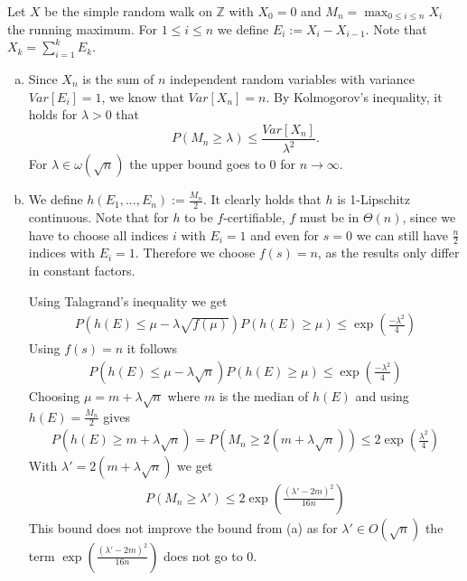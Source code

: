 \begin{aufgabe}
    Let $X$ be the simple random walk on $\mathbb{Z}$ with $X_0 = 0$ and $M_n = \max_{0 \leq i \leq n}X_i$ the running maximum. For $1 \leq i \leq n$ we define $E_i := X_i - X_{i-1}$. Note that $X_k = \sum_{i = 1}^kE_k$.
    \begin{enumerate}[(a)]
        \item Since $X_n$ is the sum of $n$ independent random variables with variance $Var[E_i] = 1$, we know that $Var[X_n] = n$. By Kolmogorov's inequality, it holds for $\lambda > 0$ that
              $$P(M_n \geq \lambda) \leq \frac{Var[X_n]}{\lambda^2}.$$
              For $\lambda \in \omega(\sqrt{n})$ the upper bound goes to $0$ for $n \rightarrow \infty$.
        \item We define $h(E_1, ..., E_n) := \frac{M_n}{2}$. It clearly holds that $h$ is 1-Lipschitz continuous. Note that for $h$ to be $f$-certifiable, $f$ must be in $\Theta(n)$, since we have to choose all indices $i$ with $E_i = 1$ and even for $s = 0$ we can still have $\frac{n}{2}$ indices with $E_i = 1$. Therefore we choose $f(s) = n$, as the results only differ in constant factors.

              Using Talagrand's inequality we get
              \begin{align*}
                  P(h(E) \leq \mu - \lambda \sqrt{f(\mu)}) P(h(E) \geq \mu) \leq \exp\left(\frac{-\lambda^2}{4}\right)
              \end{align*}
              Using $f(s) = n$ it follows
              \begin{align*}
                  P(h(E) \leq \mu - \lambda \sqrt{n}) P(h(E) \geq \mu) \leq \exp\left(\frac{-\lambda^2}{4}\right)
              \end{align*}
              Choosing $\mu = m + \lambda \sqrt{n}$ where $m$ is the median of $h(E)$ and using $h(E) = \frac{M_n}{2}$ gives
              \begin{align*}
                  P(h(E) \geq m + \lambda \sqrt{n}) = P(M_n \geq 2(m + \lambda \sqrt{n})) \leq 2 \exp\left(\frac{\lambda^2}{4}\right)
              \end{align*}
              With $\lambda' = 2(m + \lambda \sqrt{n})$ we get
              \begin{align*}
                  P(M_n \geq \lambda') \leq 2 \exp\left(\frac{(\lambda' -2m)^2}{16n}\right)
              \end{align*}
              This bound does not improve the bound from (a) as for $\lambda' \in O(\sqrt{n})$ the term $\exp\left(\frac{(\lambda' -2m)^2}{16n}\right)$ does not go to $0$.


    \end{enumerate}
\end{aufgabe}
